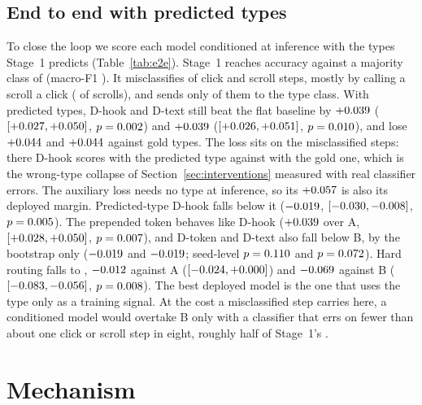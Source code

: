 \documentclass[letterpaper]{article} %
\begin{document}
\subsection{End to end with predicted types}
\label{sec:e2e}
To close the loop we score each model conditioned at inference with the types Stage~1 predicts (Table~\ref{tab:e2e}). Stage~1 reaches \nSacc{} accuracy against a majority class of \nSmaj{} (macro-F1 \nSfone). It misclassifies \nSerr{} of click and scroll steps, mostly by calling a scroll a click (\nSscrolltoclick{} of scrolls), and sends only \nStotype{} of them to the type class. With predicted types, D-hook and D-text still beat the flat baseline by $+0.039$ ($[+0.027, +0.050]$, $p = 0.002$) and $+0.039$ ($[+0.026, +0.051]$, $p = 0.010$), and lose $+0.044$ and $+0.044$ against gold types. The loss sits on the misclassified steps: there D-hook scores \neDhookwrongpred{} with the predicted type against \neDhookwronggold{} with the gold one, which is the wrong-type collapse of Section~\ref{sec:interventions} measured with real classifier errors. The auxiliary loss needs no type at inference, so its $+0.057$ is also its deployed margin. Predicted-type D-hook falls below it ($-0.019$, $[-0.030, -0.008]$, $p = 0.005$). The prepended token behaves like D-hook ($+0.039$ over A, $[+0.028, +0.050]$, $p = 0.007$), and D-token and D-text also fall below B, by the bootstrap only ($-0.019$ and $-0.019$; seed-level $p = 0.110$ and $p = 0.072$). Hard routing falls to \neCpred{}, $-0.012$ against A ($[-0.024, +0.000]$) and $-0.069$ against B ($[-0.083, -0.056]$, $p = 0.008$).
The best deployed model is the one that uses the type only as a training signal. At the cost a misclassified step carries here, a conditioned model would overtake B only with a classifier that errs on fewer than about one click or scroll step in eight, roughly half of Stage~1's \nSerr{}.



\section{Mechanism}
\label{sec:mechanism}
\end{document}
